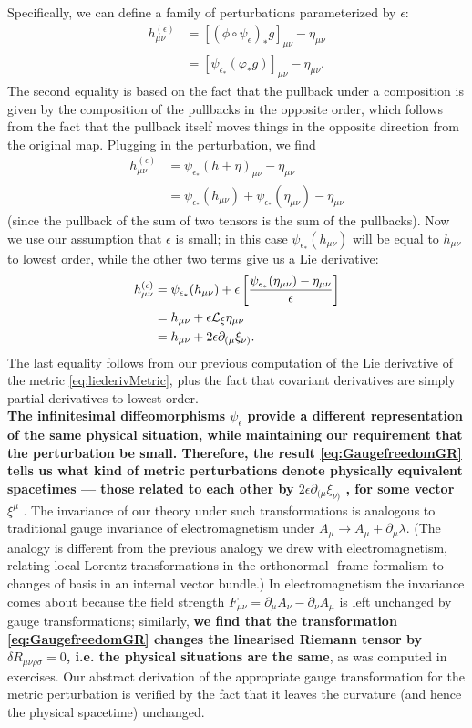 \begin{enumerate}
Specifically, we can define a family of perturbations parameterized by $\epsilon$:
\begin{align*}
	h^{(\epsilon )}_{\mu \nu} &= [(\phi \circ ψ_\epsilon )_* g]_{ μν} − η_{μν}\\
	&= [ψ_{\epsilon_*} (φ_* g)]_{ μν} − η_{ μν}.
\end{align*}
The second equality is based on the fact that the pullback under a composition is given by
the composition of the pullbacks in the opposite order, which follows from the fact that the
pullback itself moves things in the opposite direction from the original map. Plugging in the
perturbation, we find
\begin{align}
	h^{(\epsilon)}_{\mu \nu} &= ψ_{\epsilon_*} (h + η)_{μν} − η_{μν} \\
	&= \psi_{\epsilon_*}(h_{\mu\nu}) + \psi_{\epsilon_*} (\eta_{\mu \nu}) - \eta_{\mu \nu} 
\end{align}
(since the pullback of the sum of two tensors is the sum of the pullbacks). Now we use our
assumption that $\epsilon$ is small; in this case $\psi_{\epsilon_*}(h_{μν} )$ will be equal to $h_{μν}$ to lowest order, while
the other two terms give us a Lie derivative:
\begin{align}
	\label{eq:GaugefreedomGR}
	h^{(\epsilon)}_{\mu \nu} &= \psi_{\epsilon_*}(h_{\mu \nu}) + \epsilon \left[ \frac{\psi_{\epsilon_*}(\eta_{\mu \nu}) - \eta_{\mu \nu}}{\epsilon}\right]\\
	&= h_{\mu \nu} +\epsilon \mathcal{L}_\xi \eta_{\mu \nu} \\
	&= h_{\mu \nu} + 2 \epsilon \partial_{(\mu}\xi_{\nu)}.
\end{align}
The last equality follows from our previous computation of the Lie derivative of the metric \ref{eq:liederivMetric}, plus the fact that covariant derivatives are simply partial derivatives to lowest order.\\
\textbf{The infinitesimal diffeomorphisms $\psi_{\epsilon}$ provide a different representation of the same physical situation, while maintaining our requirement that the perturbation be small. Therefore,
the result \ref{eq:GaugefreedomGR} tells us what kind of metric perturbations denote physically equivalent
spacetimes — those related to each other by $2\epsilon ∂_{ (μ} ξ_{ ν)}$ , for some vector $ξ^μ$ }. The invariance of our theory under such transformations is analogous to traditional gauge invariance of electromagnetism under $A_μ → A_μ + ∂_μ λ$. (The analogy is different from the previous analogy
we drew with electromagnetism, relating local Lorentz transformations in the orthonormal-
frame formalism to changes of basis in an internal vector bundle.) In electromagnetism the
invariance comes about because the field strength $F_{μν} = ∂_μ A_ν − ∂_ν A_μ$ is left unchanged
by gauge transformations; similarly, \textbf{we find that the transformation \ref{eq:GaugefreedomGR} changes the linearised Riemann tensor by $\delta R_{\mu \nu \rho \sigma}=0$, i.e. the physical situations are the same},  as was computed in exercises. Our abstract derivation of the appropriate gauge transformation for the metric perturbation is verified by the fact that it leaves the curvature (and hence the physical spacetime)
unchanged.


\end{enumerate}
